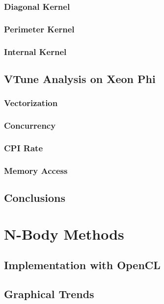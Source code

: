 \documentclass[fleqn,10pt,onecolumn]{ipcc} %
\begin{document}
\subsubsection{Diagonal Kernel}

\subsubsection{Perimeter Kernel}

\subsubsection{Internal Kernel}

\subsection{VTune Analysis on Xeon Phi}

\subsubsection{Vectorization}
\label{sec:luVec}

\subsubsection{Concurrency}
\label{sec:luCon}

\subsubsection{CPI Rate}
\label{sec:luCPI}

\subsubsection{Memory Access}
\label{sec:luMAP}

\subsection{Conclusions}

\section{N-Body Methods}

\subsection{Implementation with OpenCL}

\subsection{Graphical Trends}

\end{document}
